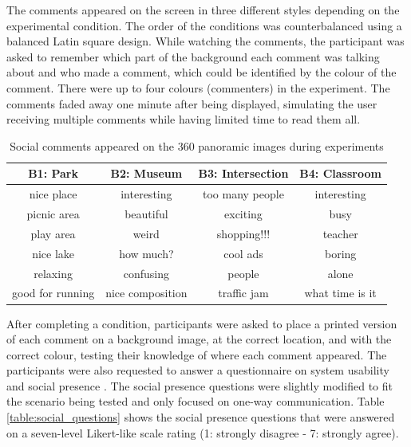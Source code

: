 The comments appeared on the screen in three different styles depending on the experimental condition. The order of the conditions was counterbalanced using a balanced Latin square design. While watching the comments, the participant was asked to remember which part of the background each comment was talking about and who made a comment, which could be identified by the colour of the comment. There were up to four colours (commenters) in the experiment. The comments faded away one minute after being displayed, simulating the user receiving multiple comments while having limited time to read them all.

\begin{table}[h]
  \centering
  \caption{Social comments appeared on the 360 panoramic images during experiments}
  \label{table:mgia16:comment}
  \begin{tabular}{ |c|c|c|c| } 
\hline
    B1: Park    & B2: Museum  &   B3: Intersection    &  B4: Classroom\\
\hline
    nice place  &   interesting &  too many people & interesting \\
    picnic area &   beautiful   &  exciting  & busy \\
    play area   &   weird   &  shopping!!! & teacher \\
    nice lake   &   how much?    &  cool ads    & boring \\
    relaxing    &   confusing   &  people    & alone \\
    good for running    &   nice composition    &  traffic jam & what time is it\\\hline
  \end{tabular}
\end{table}

After completing a condition, participants were asked to place a printed version of each comment on a background image, at the correct location, and with the correct colour, testing their knowledge of where each comment appeared. The participants were also requested to answer a questionnaire on system usability \cite{brooke1996sus} and social presence \cite{Harms2004}. The social presence questions were slightly modified to fit the scenario being tested and only focused on one-way communication. Table \ref{table:social_questions} shows the social presence questions that were answered on a seven-level Likert-like scale rating (1: strongly disagree - 7: strongly agree). 

